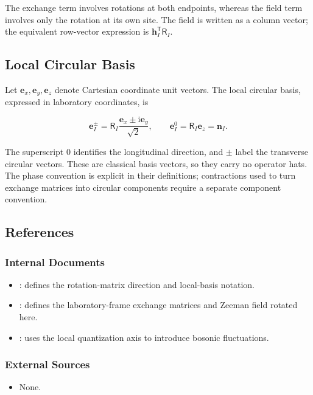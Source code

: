 The exchange term involves rotations at both endpoints, whereas the field term involves only the rotation at its own site. The field is written as a column vector; the equivalent row-vector expression is \(\mathbf h_I^{\mathsf T}\mathsf R_I\).

\subsection{Local Circular Basis}

Let \(\mathbf e_x,\mathbf e_y,\mathbf e_z\) denote Cartesian coordinate unit vectors. The local circular basis, expressed in laboratory coordinates, is

\[
\mathbf e_I^\pm
=\mathsf R_I\frac{\mathbf e_x\pm\mathrm i\mathbf e_y}{\sqrt2},
\qquad
\mathbf e_I^0=\mathsf R_I\mathbf e_z=\mathbf n_I.
\]

The superscript \(0\) identifies the longitudinal direction, and \(\pm\) label the transverse circular vectors. These are classical basis vectors, so they carry no operator hats. The phase convention is explicit in their definitions; contractions used to turn exchange matrices into circular components require a separate component convention.

\subsection{References}

\subsubsection{Internal Documents}

\begin{itemize}
\tightlist
\item
  : defines the rotation-matrix direction and local-basis notation.
\item
  : defines the laboratory-frame exchange matrices and Zeeman field rotated here.
\item
  : uses the local quantization axis to introduce bosonic fluctuations.
\end{itemize}

\subsubsection{External Sources}

\begin{itemize}
\tightlist
\item
  None.
\end{itemize}
